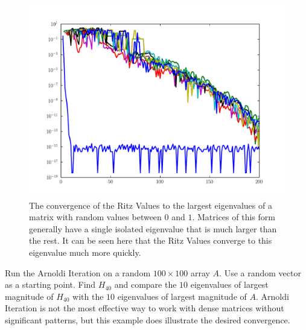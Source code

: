 \begin{figure}
\includegraphics[width=\textwidth]{rand_vals_conv.pdf}
\caption{The convergence of the Ritz Values to the largest eigenvalues of a matrix with random values between $0$ and $1$.
Matrices of this form generally have a single isolated eigenvalue that is much larger than the rest.
It can be seen here that the Ritz Values converge to this eigenvalue much more quickly.}
\label{fig:arnoldi_random_val_conv}
\end{figure}

\begin{problem}
Run the Arnoldi Iteration on a random $100 \times 100$ array $A$.
Use a random vector as a starting point.
Find $H_{40}$ and compare the $10$ eigenvalues of largest magnitude of $H_{40}$ with the $10$ eigenvalues of largest magnitude of $A$.
Arnoldi Iteration is not the most effective way to work with dense matrices without significant patterns, but this example does illustrate the desired convergence.
\end{problem}

